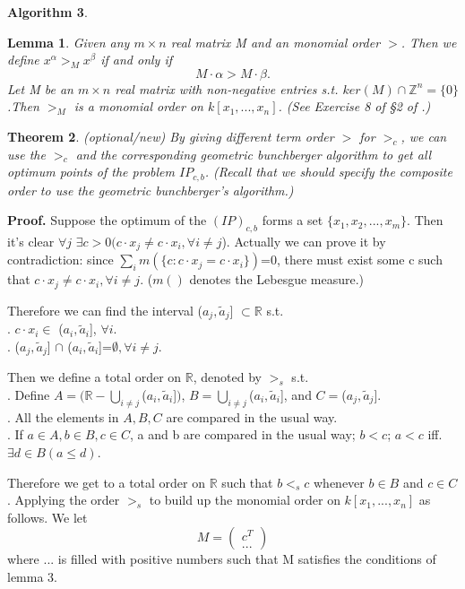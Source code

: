 \documentclass{article}
\theoremstyle{plain}
\newtheorem{theorem}{Theorem}[section]
\newtheorem{lemma}[theorem]{Lemma}
\theoremstyle{definition}
\newtheorem{algorithm}[theorem]{Algorithm}
\begin{document}
\begin{algorithm}
\begin{lemma} Given any $m \times n$ real matrix M and an monomial order $>$. Then we define $x^{\alpha}>_M x^{\beta}$ if and only if $$ M\cdot \alpha >M\cdot \beta.$$ Let M be an $m \times n$ real matrix with non-negative entries s.t. $ker(M) \cap \mathbb{Z}^{n}= \{0\}$.Then $>_M$ is a monomial order on $k[x_1, . . . , x_n]$. (See Exercise 8 of §2 of \cite{ref2}.) \end{lemma}

\begin{theorem} (optional/new)  By giving different term order $>$ for $>_c$, we can use the $>_c$ and the corresponding geometric bunchberger algorithm to get all optimum points of the problem $IP_{c,b}$. (Recall that we should specify the composite order to use the geometric bunchberger's algorithm.)\end{theorem}

\noindent\textbf{Proof.}  Suppose the optimum of the $(IP)_{c,b}$ forms a set $\{x_1,x_2,...,x_m\}$. Then it's clear $\forall j$ $ \exists c>0( c\cdot x_j\neq c\cdot x_i,\forall i\neq j$). Actually we can prove it by contradiction: since $\sum_{i}m(\{c:c\cdot x_j= c\cdot x_i\})$=0, there must exist some c such that $c\cdot x_j\neq c\cdot x_i,\forall i\neq j$. ($m()$ denotes the Lebesgue measure.)

Therefore we can find the interval ($a_j,\tilde{a}_j$] $\subset \mathbb{R}$ s.t. \\
\indent {}. $c\cdot x_i \in$ ($a_i,\tilde{a}_i$], $\forall i$.  \\
\indent  {}. ($a_j,\tilde{a}_j$] $\cap$  ($a_i,\tilde{a}_i$]=$\emptyset,\forall i\neq j$.  

Then we define a total order on $\mathbb{R}$, denoted by $>_{s}$ s.t.  \\
\indent {}. Define $ A=\big(\mathbb{R}-\bigcup_{i\neq j}$($a_i,\tilde{a}_i$]$\big)$, $B = \bigcup_{i\neq j}$($a_i,\tilde{a}_i$], and $C =$($a_j,\tilde{a}_j$]. \\
\indent {}. All the elements in $A,B,C$ are compared in the usual way. \\
\indent {}. If $a\in A,b\in B,c\in C$, a and b are compared in the usual way; $b<c$; $a<c$ iff.  $\exists d\in B(a \leq d)$. 

Therefore we get to a total order on $\mathbb{R}$ such that $b<_{s}c$ whenever $b\in B$ and $c\in C$. Applying the order $>_{s}$ to build up the monomial order on $k[x_1, . . . , x_n]$ as follows. We let
$$M=\begin{pmatrix} c^T \\ ... \end{pmatrix}$$
where $...$ is filled with positive numbers such that M satisfies the conditions of lemma 3.


\end{algorithm}
\end{document}
